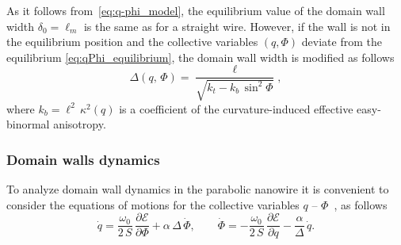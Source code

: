 
As it follows from~\eqref{eq:q-phi_model}, the equilibrium value of the domain wall width $\delta_0 = \ell_m$ is the same as for a straight wire. However, if the wall is not in the equilibrium position and the collective variables $(q,\Phi)$ deviate from the equilibrium \eqref{eq:qPhi_equilibrium}, the domain wall width is modified as follows~\cite{Yershov15b}
\begin{equation}
	\Delta(q, \, \Phi) = \dfrac{\ell}{\sqrt{k_t - k_b \, \sin^2 \Phi}},
\end{equation}
where $k_b = \ell^2 \, \kappa^2(q)$ is a coefficient of the curvature-induced effective easy-binormal anisotropy. 



\subsubsection{Domain walls dynamics} \label{subsubsec:Parabola_dynamics}

To analyze domain wall dynamics in the parabolic nanowire it is convenient to consider the equations of motions for the collective variables $q$ -- $\Phi$~\cite{Yershov15b}, as follows
\begin{equation} \label{eq:qPhi_dynamics}
	\dot{q} = \dfrac{\omega_0}{2 \, S} \, \dfrac{\partial \mathcal{E}}{\partial \Phi} + \alpha \, \Delta \, \dot{\Phi}, \qquad \dot{\Phi} = - \dfrac{\omega_0}{2 \, S} \, \dfrac{\partial \mathcal{E}}{\partial q} - \dfrac{\alpha}{\Delta} \, \dot{q}.
\end{equation}


